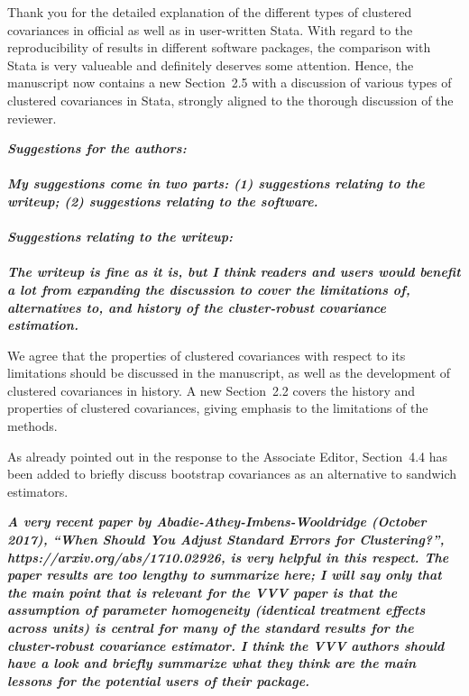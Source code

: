 \documentclass[10pt,a4paper]{article}
\begin{document}
\medskip

Thank you for the detailed explanation of the different types of clustered covariances in official as well as in user-written Stata.
With regard to the reproducibility of results in different software packages, the comparison with Stata is very valueable and definitely deserves some attention.
Hence, the manuscript now contains a new Section~2.5 with a discussion of various types of clustered covariances in Stata, strongly aligned to the thorough discussion of the reviewer.

\medskip

\textbf{\textit{Suggestions for the authors:
\\ \\
My suggestions come in two parts: (1) suggestions relating to the writeup; (2) suggestions relating to the software.
\\ \\
Suggestions relating to the writeup:
\\ \\
The writeup is fine as it is, but I think readers and users would benefit a lot from expanding the discussion to cover the limitations of, alternatives to, and history of the cluster-robust covariance estimation.
}}

\medskip

We agree that the properties of clustered covariances with respect to its limitations should be discussed in the manuscript, as well as the development of clustered covariances in history.
A new Section~2.2 covers the history and properties of clustered covariances, giving emphasis to the limitations of the methods.

As already pointed out in the response to the Associate Editor, Section~4.4 has been added to
briefly discuss bootstrap covariances as an alternative to sandwich estimators. 

\medskip

\textbf{\textit{A very recent paper by Abadie-Athey-Imbens-Wooldridge (October 2017), ``When Should You Adjust Standard Errors for Clustering?'', https://arxiv.org/abs/1710.02926, is very helpful in this respect.  The paper results are too lengthy to summarize here; I will say only that the main point that is relevant for the VVV paper is that the assumption of parameter homogeneity (identical treatment effects across units) is central for many of the standard results for the cluster-robust covariance estimator.  I think the VVV authors should have a look and briefly summarize what they think are the main lessons for the potential users of their package.
}}
\end{document}
